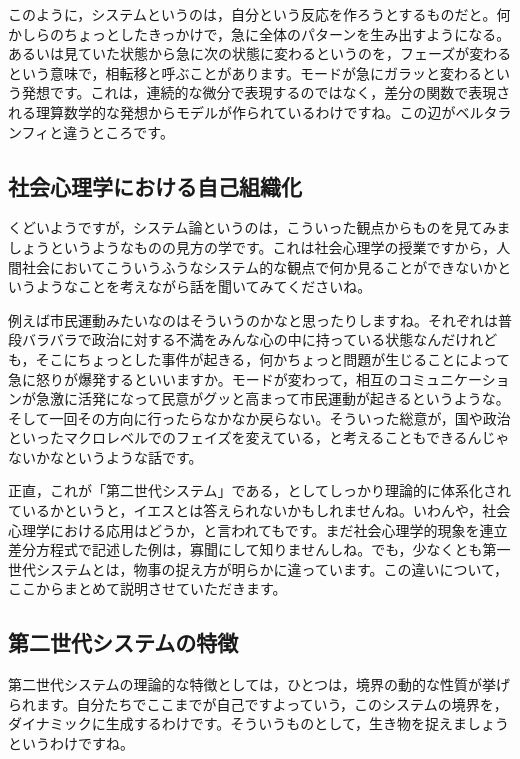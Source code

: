\documentclass{ltjsbook}
\begin{document}
このように，システムというのは，自分という反応を作ろうとするものだと。何かしらのちょっとしたきっかけで，急に全体のパターンを生み出すようになる。あるいは見ていた状態から急に次の状態に変わるというのを，フェーズが変わるという意味で，相転移と呼ぶことがあります。モードが急にガラッと変わるという発想です。これは，連続的な微分で表現するのではなく，差分の関数で表現される理算数学的な発想からモデルが作られているわけですね。この辺がベルタランフィと違うところです。

\subsection{社会心理学における自己組織化}

くどいようですが，システム論というのは，こういった観点からものを見てみましょうというようなものの見方の学です。これは社会心理学の授業ですから，人間社会においてこういうふうなシステム的な観点で何か見ることができないかというようなことを考えながら話を聞いてみてくださいね。

例えば市民運動みたいなのはそういうのかなと思ったりしますね。それぞれは普段バラバラで政治に対する不満をみんな心の中に持っている状態なんだけれども，そこにちょっとした事件が起きる，何かちょっと問題が生じることによって急に怒りが爆発するといいますか。モードが変わって，相互のコミュニケーションが急激に活発になって民意がグッと高まって市民運動が起きるというような。そして一回その方向に行ったらなかなか戻らない。そういった総意が，国や政治といったマクロレベルでのフェイズを変えている，と考えることもできるんじゃないかなというような話です。

正直，これが「第二世代システム」である，としてしっかり理論的に体系化されているかというと，イエスとは答えられないかもしれませんね。いわんや，社会心理学における応用はどうか，と言われてもです。まだ社会心理学的現象を連立差分方程式で記述した例は，寡聞にして知りませんしね。でも，少なくとも第一世代システムとは，物事の捉え方が明らかに違っています。この違いについて，ここからまとめて説明させていただきます。

\subsection{第二世代システムの特徴}

第二世代システムの理論的な特徴としては，ひとつは，境界の動的な性質が挙げられます。自分たちでここまでが自己ですよっていう，このシステムの境界を，ダイナミックに生成するわけです。そういうものとして，生き物を捉えましょうというわけですね。
\end{document}
